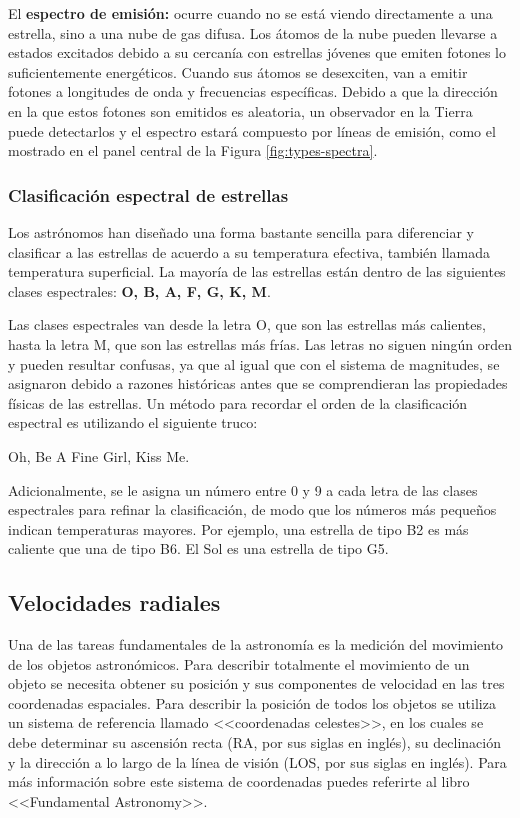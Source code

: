 El \textbf{espectro de emisión:} ocurre cuando no se está viendo directamente a una estrella, sino a una nube de gas difusa. Los átomos de la nube pueden llevarse a estados excitados debido a su cercanía con estrellas jóvenes que emiten fotones lo suficientemente energéticos. Cuando sus átomos se desexciten, van a emitir fotones a longitudes de onda y frecuencias específicas. Debido a que la dirección en la que estos fotones son emitidos es aleatoria, un observador en la Tierra puede detectarlos y el espectro estará compuesto por líneas de emisión, como el mostrado en el panel central de la Figura \ref{fig:types-spectra}.

\subsubsection{Clasificación espectral de estrellas}
Los astrónomos han diseñado una forma bastante sencilla para diferenciar y clasificar a las estrellas de acuerdo a su temperatura efectiva, también llamada temperatura superficial. La mayoría de las estrellas están dentro de las siguientes clases espectrales: \textbf{O, B, A, F, G, K, M}. 

Las clases espectrales van desde la letra O, que son las estrellas más calientes, hasta la letra M, que son las estrellas más frías. Las letras no siguen ningún orden y pueden resultar confusas, ya que al igual que con el sistema de magnitudes, se asignaron debido a razones históricas antes que se comprendieran las propiedades físicas de las estrellas. Un método para recordar el orden de la clasificación espectral es utilizando el siguiente truco:

Oh, Be A Fine Girl, Kiss Me.

Adicionalmente, se le asigna un número entre 0 y 9 a cada letra de las clases espectrales para refinar la clasificación, de modo que los números más pequeños indican temperaturas mayores. Por ejemplo, una estrella de tipo B2 es más caliente que una de tipo B6. El Sol es una estrella de tipo G5.

\subsection{Velocidades radiales}
Una de las tareas fundamentales de la astronomía es la medición del movimiento de los objetos astronómicos. Para describir totalmente el movimiento de un objeto se necesita obtener su posición y sus componentes de velocidad en las tres coordenadas espaciales. Para describir la posición de todos los objetos se utiliza un sistema de referencia llamado <<coordenadas celestes>>, en los cuales se debe determinar su ascensión recta (RA, por sus siglas en inglés), su declinación y la dirección a lo largo de la línea de visión (LOS, por sus siglas en inglés). Para más información sobre este sistema de coordenadas puedes referirte al libro <<Fundamental Astronomy>>. 


